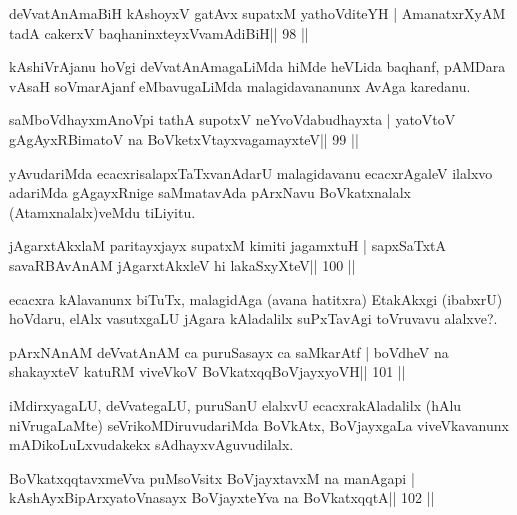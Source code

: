 
\begin{shl}
deVvatAnAmaBiH kAshoyxV gatAvx supatxM yathoVditeYH |
AmanatxrXyAM tadA cakerxV baqhaninxteyxVvamAdiBiH\hfill || 98 ||
\end{shl}

\begin{artha}
kAshiVrAjanu hoVgi deVvatAnAmagaLiMda hiMde heVLida baqhanf,  pAMDara	vAsaH soVmarAjanf eMbavugaLiMda malagidavananunx AvAga karedanu.
\end{artha}

\begin{shl}
saMboVdhayxmAnoV\s pi tathA supotxV neYvoVdabudhayxta |
yatoV\s toV gAgAyxRBimatoV na BoVketxVtayxvagamayxteV\hfill || 99 ||
\end{shl}

\begin{artha}
yAvudariMda ecacxrisalapxTaTxvanAdarU malagidavanu ecacxrAgaleV ilalxvo adariMda gAgayxRnige saMmatavAda pArxNavu BoVkatxnalalx (Atamxnalalx)veMdu tiLiyitu.
\end{artha} 


\begin{shl}
jAgarxtAkxlaM paritayxjayx supatxM kimiti jagamxtuH |
sapxSaTxtA savaRBAvAnAM jAgarxtAkxleV hi lakaSxyXteV\hfill || 100 ||
\end{shl}

\begin{artha}
ecacxra kAlavanunx biTuTx, malagidAga (avana hatitxra) EtakAkxgi (ibabxrU) hoVdaru, elAlx vasutxgaLU jAgara kAladalilx suPxTavAgi toVruvavu  alalxve?.
\end{artha}


\begin{shl}
pArxNAnAM deVvatAnAM ca puruSasayx ca saMkarAtf |
boVdheV na shakayxteV katuRM viveVkoV BoVkatxqqBoVjayxyoVH\hfill || 101 ||
\end{shl}

\begin{artha}
iMdirxyagaLU, deVvategaLU, puruSanU elalxvU ecacxrakAladalilx (hAlu niVrugaLaMte) seVrikoMDiruvudariMda BoVkAtx, BoVjayxgaLa viveVkavanunx mADikoLuLxvudakekx sAdhayxvAguvudilalx.
\end{artha} 

\begin{shl}
BoVkatxqqtavxmeVva puMsoV\s sitx BoVjayxtavxM na manAgapi |
kAshAyxBipArxyatoV\s nasayx BoVjayxteYva na BoVkatxqqtA\hfill || 102 ||
\end{shl}

